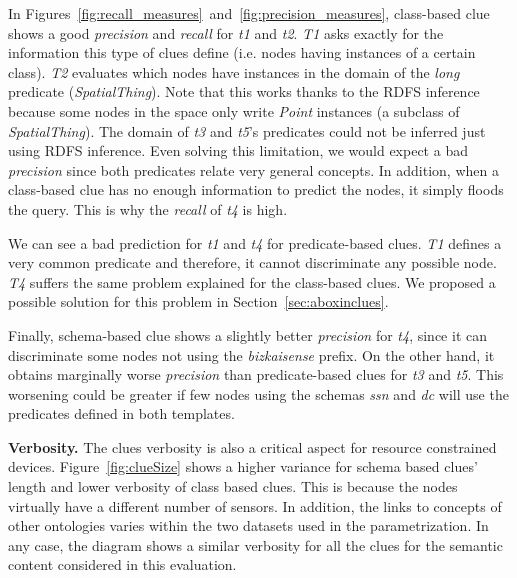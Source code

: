 In Figures~\ref{fig:recall_measures}~and~\ref{fig:precision_measures}, class-based clue shows a good \emph{precision} and \emph{recall} for \emph{t1} and \emph{t2}.
\emph{T1} asks exactly for the information this type of clues define (i.e. nodes having instances of a certain class).
\emph{T2} evaluates which nodes have instances in the domain of the \emph{long} predicate (\emph{SpatialThing}).
Note that this works thanks to the RDFS inference because some nodes in the space only write \emph{Point} instances (a subclass of \emph{SpatialThing}).
The domain of \emph{t3} and \emph{t5}'s predicates could not be inferred just using RDFS inference. %
Even solving this limitation, we would expect a bad \emph{precision} since both predicates relate very general concepts.
In addition, when a class-based clue has no enough information to predict the nodes, it simply floods the query.
This is why the \emph{recall} of \emph{t4} is high.





We can see a bad prediction for \emph{t1} and \emph{t4} for predicate-based clues.
\emph{T1} defines a very common predicate and therefore, it cannot discriminate any possible node.
\emph{T4} suffers the same problem explained for the class-based clues.
We proposed a possible solution for this problem in Section~\ref{sec:aboxinclues}.

Finally, schema-based clue shows a slightly better \emph{precision} for \emph{t4}, since it can discriminate some nodes not using the \emph{bizkaisense} prefix.
On the other hand, it obtains marginally worse \emph{precision} than predicate-based clues for \emph{t3} and \emph{t5}.
This worsening could be greater if few nodes using the schemas \emph{ssn} and \emph{dc} will use the predicates defined in both templates.

\medskip

\noindent\textbf{Verbosity.}
The clues verbosity is also a critical aspect for resource constrained devices.
Figure~\ref{fig:clueSize} shows a higher variance for schema based clues' length and lower verbosity of class based clues.
This is because the nodes virtually have a different number of sensors.
In addition, the links to concepts of other ontologies varies within the two datasets used in the parametrization.
In any case, the diagram shows a similar verbosity for all the clues for the semantic content considered in this evaluation. %


